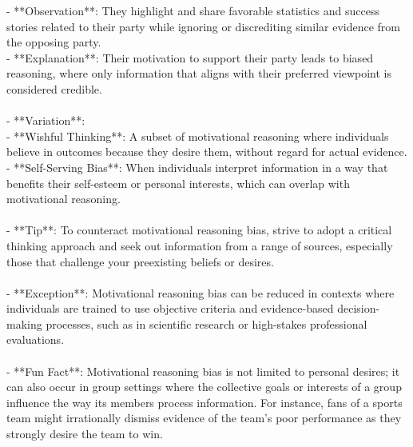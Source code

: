 \documentclass[a4paper,12pt,single,pdftex]{scrbook}
\begin{document}
    
        - **Observation**: They highlight and share favorable statistics and success stories related to their party while ignoring or discrediting similar evidence from the opposing party.
    \\

    
        - **Explanation**: Their motivation to support their party leads to biased reasoning, where only information that aligns with their preferred viewpoint is considered credible.
    \\

    
      
    \\

    
      - **Variation**:
    \\

    
        - **Wishful Thinking**: A subset of motivational reasoning where individuals believe in outcomes because they desire them, without regard for actual evidence.
    \\

    
        - **Self-Serving Bias**: When individuals interpret information in a way that benefits their self-esteem or personal interests, which can overlap with motivational reasoning.
    \\

    
      
    \\

    
      - **Tip**: To counteract motivational reasoning bias, strive to adopt a critical thinking approach and seek out information from a range of sources, especially those that challenge your preexisting beliefs or desires.
    \\

    
      
    \\

    
      - **Exception**: Motivational reasoning bias can be reduced in contexts where individuals are trained to use objective criteria and evidence-based decision-making processes, such as in scientific research or high-stakes professional evaluations.
    \\

    
      
    \\

    
      - **Fun Fact**: Motivational reasoning bias is not limited to personal desires; it can also occur in group settings where the collective goals or interests of a group influence the way its members process information. For instance, fans of a sports team might irrationally dismiss evidence of the team's poor performance as they strongly desire the team to win.
    \\
\end{document}
